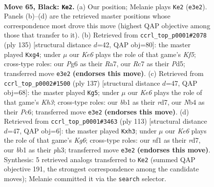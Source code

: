 \documentclass[11pt]{article}
\begin{document}
\clearpage

\begin{figure}[p]\centering
\begin{subfigure}{0.46\textwidth}\centering
\resizebox{\linewidth}{!}{%
\newchessgame
\chessboard[
  setfen={8/2r2p1p/6p1/4P3/bn3Pp1/4k1K1/7P/1B3N2 b - - 21 65},
  showmover=false,
  pgfstyle=straightmove, color=movearrow, markmove={e3-e2}
]}
\caption{}
\end{subfigure}\hfill
\begin{subfigure}{0.46\textwidth}\centering
\resizebox{\linewidth}{!}{%
\newchessgame
\chessboard[
  setfen={8/r7/2Bn1p2/3p2p1/1Kp2kP1/2P5/1P3R2/8 b - - 1 68},
  showmover=false,
  pgfstyle=straightmove, color=movearrow, markmove={f4-g4}
]}
\caption{}
\end{subfigure}
\\[4pt]
\begin{subfigure}{0.46\textwidth}\centering
\resizebox{\linewidth}{!}{%
\newchessgame
\chessboard[
  setfen={8/3R4/2p4k/5N2/1n4p1/2p2pP1/5P1K/2r3B1 b - - 7 69},
  showmover=false,
  pgfstyle=straightmove, color=movearrow, markmove={h6-g5}
]}
\caption{}
\end{subfigure}\hfill
\begin{subfigure}{0.46\textwidth}\centering
\resizebox{\linewidth}{!}{%
\newchessgame
\chessboard[
  setfen={6r1/3R2p1/1P3p1p/3Kp3/4P1P1/6kP/8/8 b - - 0 57},
  showmover=false,
  pgfstyle=straightmove, color=movearrow, markmove={g3-h3}
]}
\caption{}
\end{subfigure}
\caption{\textbf{Move 65, Black: \texttt{Ke2}.} (a) Our position; Melanie plays \texttt{Ke2} (\texttt{e3e2}). Panels (b)--(d) are the retrieved master positions whose correspondence most drove this move (highest QAP objective among those that transfer to it). (b) Retrieved from \texttt{ccrl\_top\_p0001\#2078} (ply 135) [structural distance $d$=42, QAP obj=80]: the master played \texttt{Kxg4}; under $\mu$ our \emph{Ke6} plays the role of that game's \emph{Kf5}; cross-type roles: our \emph{P}g6 as their \emph{R}a7, our \emph{R}c7 as their \emph{P}d5; transferred move \texttt{e3e2} \textbf{(endorses this move)}. (c) Retrieved from \texttt{ccrl\_top\_p0002\#1500} (ply 137) [structural distance $d$=47, QAP obj=68]: the master played \texttt{Kg5}; under $\mu$ our \emph{Ke6} plays the role of that game's \emph{Kh3}; cross-type roles: our \emph{b}b1 as their \emph{r}d7, our \emph{N}b4 as their \emph{P}c6; transferred move \texttt{e3e2} \textbf{(endorses this move)}. (d) Retrieved from \texttt{ccrl\_top\_p0001\#3463} (ply 113) [structural distance $d$=47, QAP obj=6]: the master played \texttt{Kxh3}; under $\mu$ our \emph{Ke6} plays the role of that game's \emph{Kg6}; cross-type roles: our \emph{n}f1 as their \emph{r}d7, our \emph{b}b1 as their \emph{p}h3; transferred move \texttt{e3e2} \textbf{(endorses this move)}. Synthesis: 5 retrieved analogs transferred to \texttt{Ke2} (summed QAP objective 191, the strongest correspondence among the candidate moves); Melanie committed it via the \texttt{search} selector.}
\label{fig:thought-m129}
\end{figure}
\end{document}
